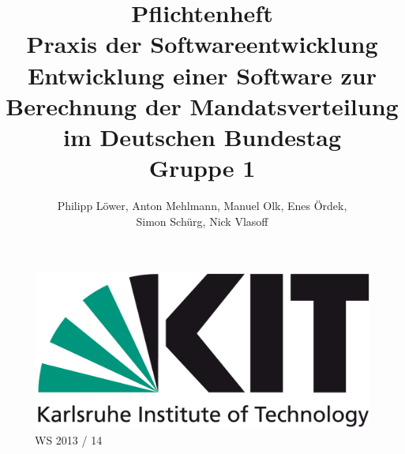 \documentclass[10pt,a4paper]{article}
\title{\Huge Pflichtenheft\\[1cm] {\bfseries Praxis der Softwareentwicklung}\\[2cm] Entwicklung einer Software zur Berechnung der Mandatsverteilung im Deutschen Bundestag\\[1cm]Gruppe 1}
\author{Philipp Löwer, Anton Mehlmann, Manuel Olk, Enes Ördek, \\Simon Schürg, Nick Vlasoff}
\date{}
\begin{document}
\maketitle
\thispagestyle{empty}

\begin{figure}[h]

\centering
		
		\includegraphics[scale=0.6]{KIT-Logo.png}\\
		\Huge WS 2013 / 14
\end{figure}

\newpage
\begin{onehalfspace}
\tableofcontents
\end{onehalfspace}
\newpage 
\end{document}
